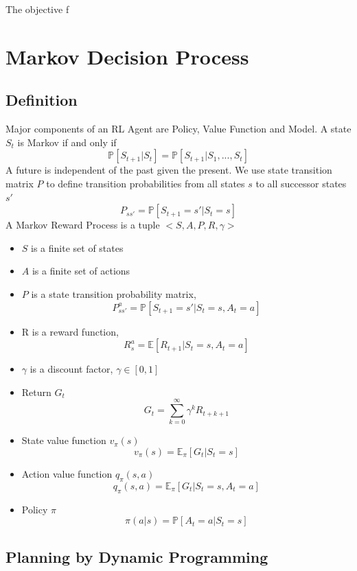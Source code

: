 \documentclass[letterpaper, 10pt, conference]{IEEEtran} %
\begin{document}
The objective f

\section{Markov Decision Process} 
\subsection{Definition}
Major components of an RL Agent are Policy, Value Function and Model. A state $S_t$ is Markov if and only if
\begin{equation}
\mathbb{P}[S_{t+1}|S_t] = \mathbb{P}[S_{t+1}|S_1, ... , S_t]
\end{equation}
A future is independent of the past given the present. We use state transition matrix $P$ to define transition probabilities from all states $s$ to all successor states $s'$
\begin{equation}
P_{ss'}=\mathbb{P}[S_{t+1}=s'|S_t=s]
\end{equation}
A Markov Reward Process is a tuple $<S, A, P, R, \gamma>$
\begin{itemize}
	\item $S$ is a finite set of states
	\item $A$ is a finite set of actions
	\item $P$ is a state transition probability matrix,
		  $$P_{ss'}^{a} = \mathbb{P}[S_{t+1} = s'| S_t = s, A_t = a]$$
	\item R is a reward function, $$R_s^a = \mathbb{E}[R_{t+1}|S_t=s, A_t = a]$$
	\item $\gamma$ is a discount factor, $\gamma \in  [0, 1]$


\item Return $G_t$ $$G_t=\sum_{k=0}^{\infty} \gamma^k R_{t+k+1}$$

\item State value function $v_\pi (s)$
$$v_\pi (s) = \mathbb{E}_\pi [G_t|S_t = s]$$
\item Action value function $q_\pi (s, a)$
$$q_\pi (s, a) = \mathbb{E}_\pi [G_t|S_t = s, A_t = a]$$
\item Policy $\pi$ $$\pi (a|s) = \mathbb{P}[A_t = a|S_t=s]$$
\end{itemize}

\subsection{Planning by Dynamic Programming}
\end{document}
